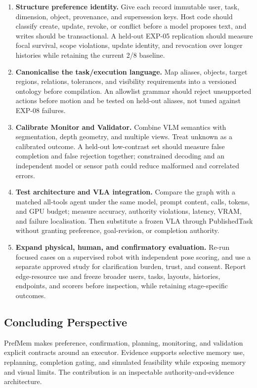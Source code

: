 \begin{enumerate}
    \setlength{\itemsep}{2pt}
    \setlength{\parsep}{0pt}
    \item \textbf{Structure preference identity.} Give each record immutable
    user, task, dimension, object, provenance, and supersession keys. Host code
    should classify create, update, revoke, or conflict before a model proposes
    text, and writes should be transactional. A held-out EXP-05 replication
    should measure focal survival, scope violations, update identity, and
    revocation over longer histories while retaining the current 2/8 baseline.

    \item \textbf{Canonicalise the task/execution language.} Map aliases,
    objects, target regions, relations, tolerances, and visibility requirements
    into a versioned ontology before compilation. An allowlist grammar should
    reject unsupported actions before motion and be tested on held-out aliases,
    not tuned against EXP-08 failures.

    \item \textbf{Calibrate Monitor and Validator.} Combine VLM semantics with
    segmentation, depth geometry, and multiple views. Treat unknown as a
    calibrated outcome. A held-out low-contrast set should measure false
    completion and false rejection together; constrained decoding and an
    independent model or sensor path could reduce malformed and correlated
    errors.

    \item \textbf{Test architecture and VLA integration.} Compare the graph
    with a matched all-tools agent under the same model, prompt content, calls,
    tokens, and GPU budget; measure accuracy, authority violations, latency,
    VRAM, and failure localisation. Then substitute a frozen VLA through
    PublishedTask without granting preference, goal-revision, or completion
    authority.

    \item \textbf{Expand physical, human, and confirmatory evaluation.} Re-run
    focused cases on a supervised robot with independent pose scoring, and use a
    separate approved study for clarification burden, trust, and consent.
    Report edge-resource use and freeze broader users, tasks, layouts, histories,
    endpoints, and scorers before inspection, while retaining stage-specific
    outcomes.
\end{enumerate}

\subsection{Concluding Perspective}
\label{subsec:discussion-conclusion}

PrefMem makes preference, confirmation, planning, monitoring, and validation
explicit contracts around an executor. Evidence supports selective memory use,
replanning, completion gating, and simulated feasibility while exposing memory
and visual limits. The contribution is an inspectable authority-and-evidence
architecture.
